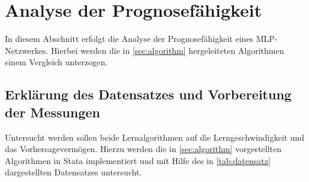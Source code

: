 

\section{Analyse der Prognosefähigkeit}\label{sec:analyse}

In diesem Abschnitt erfolgt die Analyse der Prognosefähigkeit eines MLP-Netzwerkes. Hierbei werden die in \autoref{sec:algorithm} hergeleiteten Algorithmen einem Vergleich unterzogen.

\subsection{Erklärung des Datensatzes und Vorbereitung der Messungen}

Untersucht werden sollen beide Lernalgorithmen auf die Lerngeschwindigkeit und das Vorhersagevermögen. Hierzu werden die in \autoref{sec:algorithm} vorgestellten Algorithmen in Stata implementiert und mit Hilfe des in \autoref{tab:datensatz} dargestellten Datensatzes untersucht.

